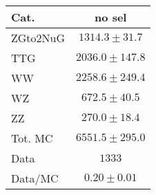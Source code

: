 % 
% 
% 
\renewcommand{\arraystretch}{1.15}
\begin{tabular}{ |l|c| }
    \hline
    Cat.      & no sel              \\
    \hline
     ZGto2NuG &   $1314.3 \pm 31.7$ \\
          TTG &  $2036.0 \pm 147.8$ \\
           WW &  $2258.6 \pm 249.4$ \\
           WZ &    $672.5 \pm 40.5$ \\
           ZZ &    $270.0 \pm 18.4$ \\
      Tot. MC &  $6551.5 \pm 295.0$ \\
         Data &              $1333$ \\
      Data/MC &     $0.20 \pm 0.01$ \\
    \hline
\end{tabular}